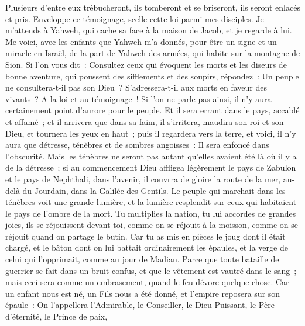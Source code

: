 \begin{multicols}{2}
Plusieurs d'entre eux trébucheront, ils tomberont et se briseront, ils seront enlacés et pris.
Enveloppe ce témoignage, scelle cette loi parmi mes disciples.
Je m'attends à Yahweh, qui cache sa face à la maison de Jacob, et je regarde à lui.
Me voici, avec les enfants que Yahweh m'a donnés, pour être un signe et un miracle en Israël, de la part de Yahweh des armées, qui habite sur la montagne de Sion.
Si l'on vous dit~: Consultez ceux qui évoquent les morts et les diseurs de bonne aventure, qui poussent des sifflements et des soupirs, répondez~: Un peuple ne consultera-t-il pas son Dieu~? S'adressera-t-il aux morts en faveur des vivants~?
A la loi et au témoignage~! Si l'on ne parle pas ainsi, il n'y aura certainement point d'aurore pour le peuple.
Et il sera errant dans le pays, accablé et affamé~; et il arrivera que dans sa faim, il s'irritera, maudira son roi et son Dieu, et tournera les yeux en haut~;
puis il regardera vers la terre, et voici, il n'y aura que détresse, ténèbres et de sombres angoisses~: Il sera enfoncé dans l'obscurité.
Mais les ténèbres ne seront pas autant qu'elles avaient été là où il y a de la détresse~; si au commencement Dieu affligea légèrement le pays de Zabulon et le pays de Nephthali, dans l'avenir, il couvrra de gloire la route de la mer, au-delà du Jourdain, dans la Galilée des Gentils.
\VerseOne{}Le peuple qui marchait dans les ténèbres voit une grande lumière, et la lumière resplendit sur ceux qui habitaient le pays de l'ombre de la mort.
Tu multiplies la nation, tu lui accordes de grandes joies, ils se réjouissent devant toi, comme on se réjouit à la moisson, comme on se réjouit quand on partage le butin.
Car tu as mis en pièces le joug dont il était chargé, et le bâton dont on lui battait ordinairement les épaules, et la verge de celui qui l'opprimait, comme au jour de Madian.
Parce que toute bataille de guerrier se fait dans un bruit confus, et que le vêtement est vautré dans le sang~; mais ceci sera comme un embrasement, quand le feu dévore quelque chose.
Car un enfant nous est né, un Fils nous a été donné, et l'empire reposera sur son épaule~: On l'appellera l'Admirable, le Conseiller, le Dieu Puissant, le Père d'éternité, le Prince de paix,

\end{multicols}
